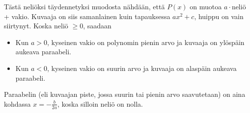Tästä neliöksi täydennetyksi muodosta nähdään, että $P(x)$ on muotoa
$a\cdot$neliö + vakio. Kuvaaja on siis samanlainen kuin tapauksessa
$ax^2+c$, huippu on vain siirtynyt.
Koska neliö $\geq 0$, saadaan

\begin{itemize}
\item Kun $a>0$, kyseinen vakio on polynomin pienin arvo ja kuvaaja on
ylöspäin aukeava paraabeli.
\item Kun $a<0$, kyseinen vakio on suurin arvo ja kuvaaja on alaspäin
aukeava paraabeli.
\end{itemize}

Paraabelin  (eli kuvaajan piste, jossa suurin tai pienin arvo
saavutetaan) on aina kohdassa
$x=-\frac{b}{2a}$, koska silloin neliö on nolla.

%
%
%
